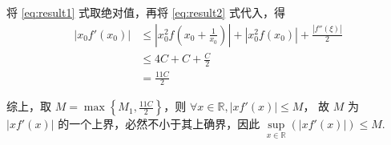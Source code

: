 \documentclass{ctexart}
\begin{document}
\begin{enumerate}
        将 \eqref{eq:result1} 式取绝对值，再将 \eqref{eq:result2} 式代入，得
        \begin{align*}
            \left| x_0 f'(x_0) \right| &\leqslant \left| x_0^2 f(x_0+\frac{1}{x_0}) \right| + \left| x_0^2 f(x_0) \right| + \frac{\left|f''(\xi)\right|}{2} \\
                                        &\leqslant 4C + C + \frac{C}{2} \\
                                        &= \frac{11C}{2}
        \end{align*}
    \end{enumerate}

    综上，取 $M=\max\left\{M_1,\frac{11C}{2}\right\}$，则 $\forall x\in \mathbb{R}, |xf'(x)|\leqslant M$，
    故 $M$ 为 $|xf'(x)|$ 的一个上界，必然不小于其上确界，因此 $\sup\limits_{x \in \mathbb{R}} \left(|xf'(x)|\right) \leqslant M$.
\end{document}

